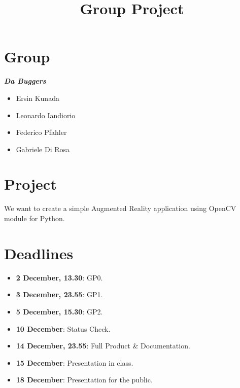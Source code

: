\documentclass[11pt]{article}
\title{\textbf{Group Project}}
\author{}
\date{}
\begin{document}
\maketitle

\section{Group}
\textit{\textbf{Da Buggers}}
\begin{itemize}
\item Ersin Kunada
\item Leonardo Iandiorio
\item Federico Pfahler
\item Gabriele Di Rosa
\end{itemize}

\section{Project}
We want to create a simple Augmented Reality application using OpenCV module for Python.

\section{Deadlines}
\begin{itemize}
\item \textbf{2 December, 13.30}: GP0.
\item \textbf{3 December, 23.55}: GP1.
\item \textbf{5 December, 15.30}: GP2.
\item \textbf{10 December}: Status Check.
\item \textbf{14 December, 23.55}: Full Product \& Documentation.
\item \textbf{15 December}: Presentation in class.
\item \textbf{18 December}: Presentation for the public.
\end{itemize}
\end{document}

